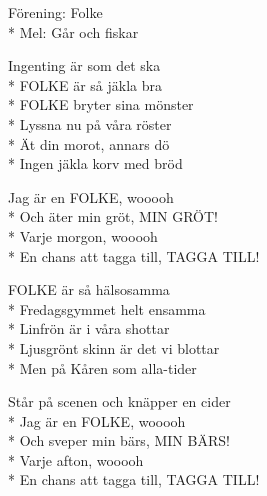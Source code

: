 \begin{SongText}
    \begin{SongInfo}
        Förening: Folke\\*%
        Mel: Går och fiskar
    \end{SongInfo}
    \begin{Verse}
        Ingenting är som det ska\\*%
        FOLKE är så jäkla bra\\*%
        FOLKE bryter sina mönster\\*%
        Lyssna nu på våra röster\\*%
        Ät din morot, annars dö\\*%
        Ingen jäkla korv med bröd
    \end{Verse}
    \begin{Verse}
        Jag är en FOLKE, wooooh\\*%
        Och äter min gröt, MIN GRÖT!\\*%
        Varje morgon, wooooh\\*%
        En chans att tagga till, TAGGA TILL!
    \end{Verse}
    \begin{Verse}
        FOLKE är så hälsosamma\\*%
        Fredagsgymmet helt ensamma\\*%
        Linfrön är i våra shottar\\*%
        Ljusgrönt skinn är det vi blottar\\*%
        Men på Kåren som alla-tider
    \end{Verse}
    \begin{Verse}
        Står på scenen och knäpper en cider\\*%
        Jag är en FOLKE, wooooh\\*%
        Och sveper min bärs, MIN BÄRS!\\*%
        Varje afton, wooooh\\*%
        En chans att tagga till, TAGGA TILL!
    \end{Verse}
\end{SongText}

